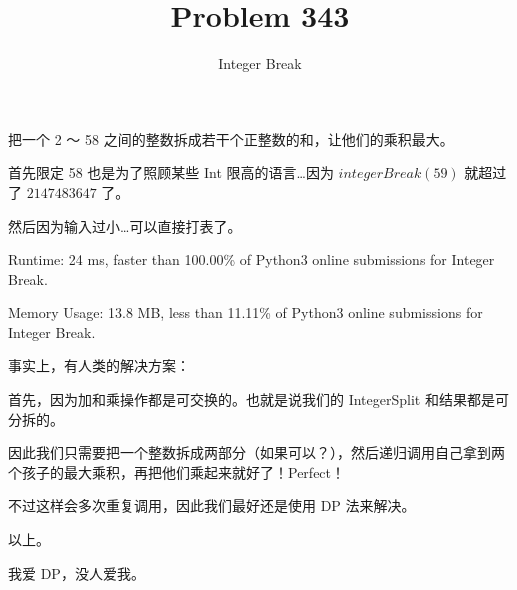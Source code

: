 \documentclass[UTF8]{ctexart}
\title{Problem 343}
\author{Integer Break}
\begin{document}
\maketitle

把一个 2 ～ 58 之间的整数拆成若干个正整数的和，让他们的乘积最大。

首先限定 58 也是为了照顾某些 Int 限高的语言…因为 $integerBreak(59)$ 就超过了 $2147483647$ 了。

然后因为输入过小…可以直接打表了。

Runtime: 24 ms, faster than 100.00\% of Python3 online submissions for Integer Break.

Memory Usage: 13.8 MB, less than 11.11\% of Python3 online submissions for Integer Break.

事实上，有人类的解决方案：

首先，因为加和乘操作都是可交换的。也就是说我们的 IntegerSplit 和结果都是可分拆的。

因此我们只需要把一个整数拆成两部分（如果可以？），然后递归调用自己拿到两个孩子的最大乘积，再把他们乘起来就好了！Perfect！

不过这样会多次重复调用，因此我们最好还是使用 DP 法来解决。

以上。

我爱 DP，没人爱我。
\end{document}
